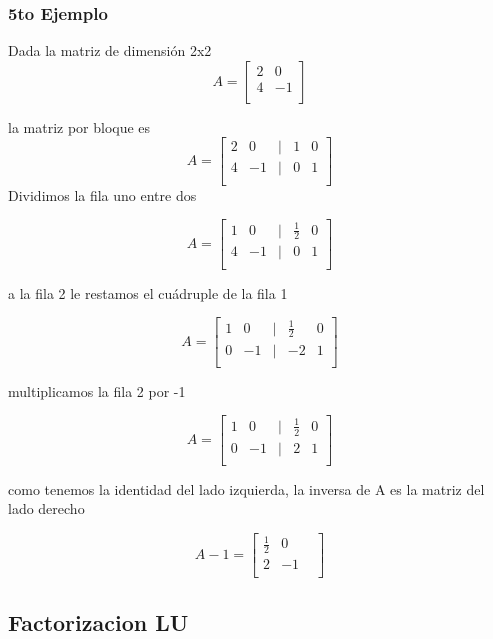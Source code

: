 \documentclass{article}
\begin{document}
\subsubsection{5to Ejemplo}
Dada la matriz de dimensión 2x2
\[
    A =
    \begin{bmatrix}
        2 & 0  \\
        4 & -1 \\
    \end{bmatrix}
\]

la matriz por bloque es
\[
    A =
    \begin{bmatrix}
        2 & 0 &  | & 1 & 0 \\
        4 & -1 & | & 0& 1 \\
    \end{bmatrix}
\]
Dividimos la fila uno entre dos

\[
    A =
    \begin{bmatrix}
        1 & 0 &  | & \frac{1}{2} & 0 \\
        4 & -1 & | & 0& 1 \\
    \end{bmatrix}
\]

a la fila 2 le restamos el cuádruple de la fila 1

\[
    A =
    \begin{bmatrix}
        1 & 0 &  | & \frac{1}{2} & 0 \\
        0 & -1 & | & -2& 1 \\
    \end{bmatrix}
\]

multiplicamos la fila 2 por -1

\[
    A =
    \begin{bmatrix}
        1 & 0 &  | & \frac{1}{2} & 0 \\
        0 & -1 & | & 2& 1 \\
    \end{bmatrix}
\]

como tenemos la identidad del lado izquierda, la inversa de A es la matriz del lado derecho

\[
    A-1 =
    \begin{bmatrix}
       \frac{1}{2}  & 0  \\
        2 & -1 &  \\
    \end{bmatrix}
\]





\subsection{Factorizacion LU}
\end{document}

